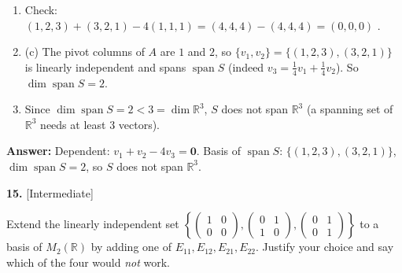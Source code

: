 \documentclass[11pt]{article}
\begin{document}
\begin{tcolorbox}[breakable,colback=ans,colframe=ansb,boxrule=0.5pt,left=4pt,right=4pt,top=2pt,bottom=2pt]
\begin{enumerate}[leftmargin=3.1em,itemsep=1pt,topsep=1pt,label=\textbf{Step \arabic*.}]
\item Check: $(1,2,3)+(3,2,1)-4(1,1,1)=(4,4,4)-(4,4,4)=(0,0,0)$ \checkmark.
\item (c) The pivot columns of $A$ are $1$ and $2$, so $\{v_1,v_2\}=\{(1,2,3),(3,2,1)\}$ is linearly independent and spans $\operatorname{span}S$ (indeed $v_3=\tfrac14v_1+\tfrac14v_2$). So $\dim\operatorname{span}S=2$.
\item Since $\dim\operatorname{span}S=2<3=\dim\mathbb{R}^{3}$, $S$ does not span $\mathbb{R}^{3}$ (a spanning set of $\mathbb{R}^{3}$ needs at least $3$ vectors).
\end{enumerate}\textbf{Answer:} Dependent: $v_1+v_2-4v_3=\mathbf 0$. Basis of $\operatorname{span}S$: $\{(1,2,3),(3,2,1)\}$, $\dim\operatorname{span}S=2$, so $S$ does not span $\mathbb{R}^{3}$.\end{tcolorbox}
\par\vspace{2pt}
\begin{minipage}{\linewidth}\textbf{15.} \hfill{\scriptsize\color{ink}[Intermediate]}\par\nopagebreak Extend the linearly independent set $\left\{\begin{pmatrix}1&0\\0&0\end{pmatrix},\begin{pmatrix}0&1\\1&0\end{pmatrix},\begin{pmatrix}0&1\\0&1\end{pmatrix}\right\}$ to a basis of $M_2(\mathbb{R})$ by adding one of $E_{11},E_{12},E_{21},E_{22}$. Justify your choice and say which of the four would \emph{not} work.
\end{minipage}\par\nopagebreak
\end{document}
